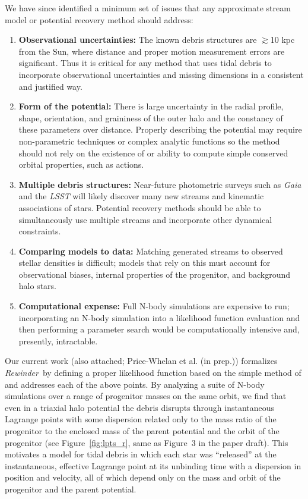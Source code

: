 \documentclass[letterpaper,12pt,preprint]{aastex}
\newcommand{\project}[1]{\textsl{#1}}
\newcommand{\gaia}{\project{Gaia}}
\newcommand{\rewinder}{\emph{Rewinder}}
\begin{document}
We have since identified a minimum set of issues that any approximate stream model or potential recovery method should address:
\begin{enumerate}
	\item \textbf{Observational uncertainties:} The known debris structures are $\gtrsim$10 kpc from the Sun, where distance and proper motion measurement errors are significant. Thus it is critical for any method that uses tidal debris to incorporate observational uncertainties and missing dimensions in a consistent and justified way. 
	\item \textbf{Form of the potential:} There is large uncertainty in the radial profile, shape, orientation, and graininess of the outer halo and the constancy of these parameters over distance. Properly describing the potential may require non-parametric techniques or complex analytic functions so the method should not rely on the existence of or ability to compute simple conserved orbital properties, such as actions.
	\item \textbf{Multiple debris structures:} Near-future photometric surveys such as \gaia\, and the \project{LSST} will likely discover many new streams and kinematic associations of stars. Potential recovery methods should be able to simultaneously use multiple streams and incorporate other dynamical constraints.
	\item \textbf{Comparing models to data:} Matching generated streams to observed stellar densities is difficult; models that rely on this must account for observational biases, internal properties of the progenitor, and background halo stars.
	\item \textbf{Computational expense:} Full N-body simulations are expensive to run; incorporating an N-body simulation into a likelihood function evaluation and then performing a parameter search would be computationally intensive and, presently, intractable. 
\end{enumerate}

Our current work (also attached; Price-Whelan et al. (in prep.)) formalizes \rewinder\ by defining a proper likelihood function based on the simple method of \cite{apw13} and addresses each of the above points. By analyzing a suite of N-body simulations over a range of progenitor masses on the same orbit, we find that even in a triaxial halo potential the debris disrupts through instantaneous Lagrange points with some dispersion related only to the mass ratio of the progenitor to the enclosed mass of the parent potential and the orbit of the progenitor (see Figure~\ref{fig:lpts_r}, same as Figure~3 in the paper draft). This motivates a model for tidal debris in which each star was ``released'' at the instantaneous, effective Lagrange point at its unbinding time with a dispersion in position and velocity, all of which depend only on the mass and orbit of the progenitor and the parent potential.
\end{document}
